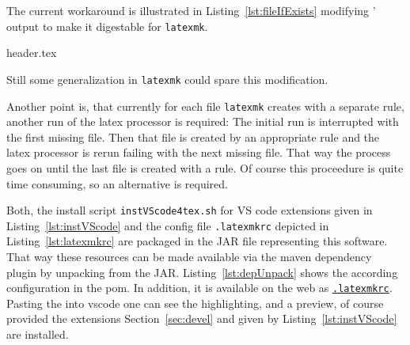 The current workaround is illustrated in Listing~\ref{lst:fileIfExists} 
modifying ' output to make it digestable for \texttt{latexmk}. 

%
{header.tex}

Still some generalization in \texttt{latexmk} could spare this modification. 

Another point is, that currently for each file \texttt{latexmk} creates with a separate rule, 
another run of the latex processor is required: 
The initial run is interrupted with the first missing file. 
Then that file is created by an appropriate rule and the latex processor is rerun 
failing with the next missing file. 
That way the process goes on until the last file is created with a rule. 
Of course this proceedure is quite time consuming, so an alternative is required. 

Both, the install script \texttt{instVScode4tex.sh} for VS code extensions 
given in Listing~\ref{lst:instVScode} 
and the config file \texttt{.latexmkrc} depicted in Listing~\ref{lst:latexmkrc} 
are packaged in the JAR file representing this software. 
That way these resources can be made available via the maven dependency plugin 
by unpacking from the JAR. 
Listing~\ref{lst:depUnpack} shows the according configuration in the pom. 
In addition, it is available on the web as 
\href{\urlSite fromMain/.latexmkrc}{\texttt{.latexmkrc}}. 
Pasting the into vscode one can see the highlighting, 
and a preview, 
of course provided the extensions Section~\ref{sec:devel} 
and given by Listing~\ref{lst:instVScode} are installed. 


